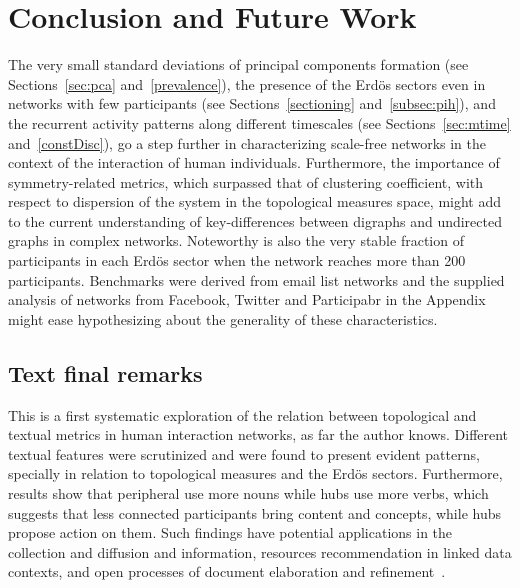 \chapter{Conclusion and Future Work}
\label{ch:concl}
The very small standard deviations of principal components formation
(see Sections~\ref{sec:pca} and~\ref{prevalence}),
the presence of the Erd\"os sectors even in networks with
few participants (see Sections~\ref{sectioning} and~\ref{subsec:pih}),
and the recurrent activity patterns along different timescales (see Sections~\ref{sec:mtime} and~\ref{constDisc}),
go a step further in characterizing scale-free networks in the context
of the interaction of human individuals.
Furthermore, the importance of symmetry-related metrics,
which surpassed that of clustering coefficient,
with respect to dispersion of the system in the topological measures space,
might add to the current understanding of key-differences between digraphs and
undirected graphs in complex networks.
Noteworthy is also the very stable fraction of participants in each Erd\"os sector when the network reaches more than 200 participants.
Benchmarks were derived from email list networks
and the supplied analysis of
networks from Facebook,
Twitter and Participabr in the Appendix might ease hypothesizing
about the generality of these characteristics.

\section{Text final remarks}\label{sec:remarks}
This is a first systematic exploration of the relation between topological and textual
metrics in human interaction networks, as far the author knows.
Different textual features were scrutinized and were found to present
evident patterns, specially in relation to topological measures and the Erd\"os sectors.
Furthermore, results show that peripheral use more nouns while hubs use more verbs,
which suggests that less connected participants bring content and concepts,
while hubs propose action on them.
Such findings have potential applications in the collection and diffusion and information,
resources recommendation in linked data contexts,
and open processes of document elaboration and refinement~\cite{ensaio,ops,opa,stab,pnud4,pnud3}.

